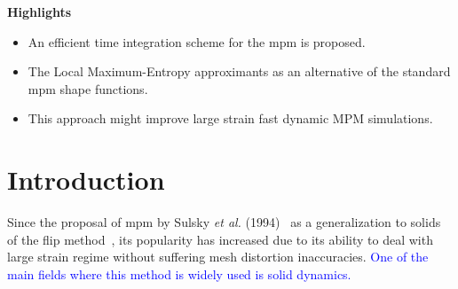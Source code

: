 \documentclass[preprint,12pt,a4paper]{elsarticle}
\begin{document}
\begin{frontmatter}
\setlength{\parskip}{1cm plus 5mm minus 4mm}
\setlength{\parskip}{1cm plus 5mm minus 4mm}
\large
\textbf{Highlights}
\normalsize
{\color{blue}
\begin{itemize}
\item An efficient time integration scheme for the \acrshort{mpm} is proposed.
\item The Local Maximum-Entropy approximants as an alternative of the standard \acrshort{mpm} shape functions.
\item This approach might improve large strain fast dynamic MPM simulations. 
\end{itemize}
}

\end{frontmatter}


\linenumbers

\section{Introduction}
\label{intro}
Since the proposal of \acrshort{mpm} by Sulsky {\it  et al.}
(1994)~\cite{Sulsky1994} as a generalization to solids of the \acrfull{flip} method~\cite{Brackbill1986}, its popularity
has increased due to its ability to deal with large strain regime
without suffering mesh distortion inaccuracies. \textcolor{blue}{One of the main fields where this method is widely used is solid dynamics.}
\end{document}
